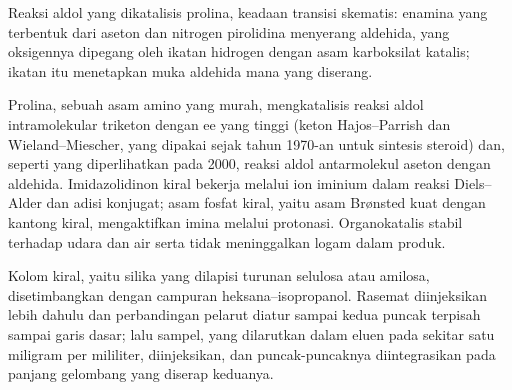 \begin{omfigure}

{\small Reaksi aldol yang dikatalisis prolina, keadaan transisi skematis:
enamina yang terbentuk dari aseton dan nitrogen pirolidina menyerang aldehida,
yang oksigennya dipegang oleh ikatan hidrogen dengan asam karboksilat katalis;
ikatan itu menetapkan muka aldehida mana yang diserang.}
\end{omfigure}

Prolina, sebuah asam amino yang murah, mengkatalisis reaksi aldol intramolekular
triketon dengan ee yang tinggi (keton Hajos--Parrish dan Wieland--Miescher, yang dipakai
sejak tahun 1970-an untuk sintesis steroid) dan, seperti yang diperlihatkan pada 2000, reaksi aldol
antarmolekul aseton dengan aldehida. Imidazolidinon kiral bekerja melalui
ion iminium dalam reaksi Diels--Alder dan adisi konjugat; asam
fosfat kiral, yaitu asam Brønsted kuat dengan kantong kiral, mengaktifkan imina
melalui protonasi. Organokatalis stabil terhadap udara dan air serta tidak meninggalkan logam
dalam produk.

\begin{inthelab}
Kolom kiral, yaitu silika yang dilapisi turunan selulosa atau amilosa,
disetimbangkan dengan campuran heksana--isopropanol. Rasemat diinjeksikan lebih dahulu
dan perbandingan pelarut diatur sampai kedua puncak terpisah sampai garis dasar; lalu
sampel, yang dilarutkan dalam eluen pada sekitar satu miligram per mililiter,
diinjeksikan, dan puncak-puncaknya diintegrasikan pada panjang gelombang yang diserap keduanya.
\end{inthelab}

